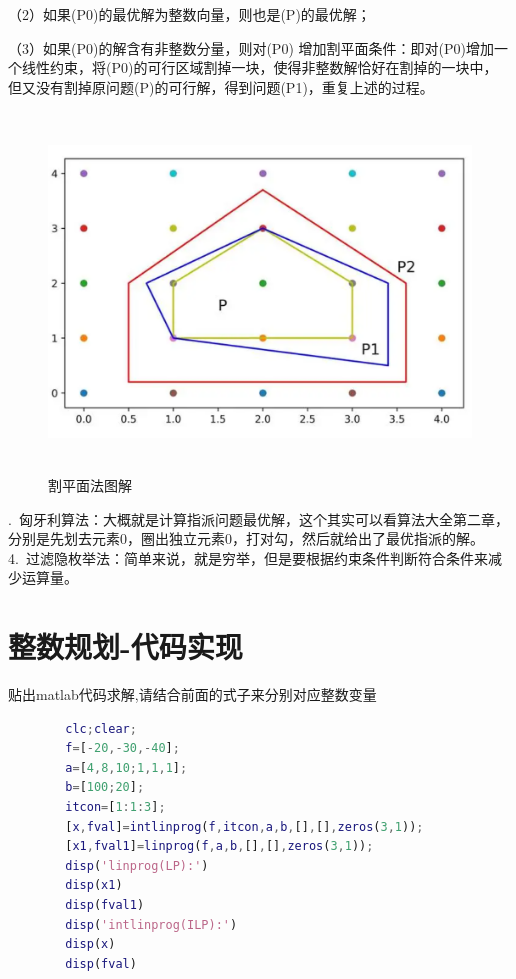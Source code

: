 \documentclass[a4paper,20pt]{article}
\begin{document}
\par \noindent（2）如果(P0)的最优解为整数向量，则也是(P)的最优解；

\par \noindent（3）如果(P0)的解含有非整数分量，则对(P0) 增加割平面条件：即对(P0)增加一个线性约束，将(P0)的可行区域割掉一块，使得非整数解恰好在割掉的一块中， 但又没有割掉原问题(P)的可行解，得到问题(P1)，重复上述的过程。
\begin{figure}[H]
    \centering
    \includegraphics[width=340pt,height=270pt]{figure2.png}
    \caption{割平面法图解}
\end{figure}
\par {}.~匈牙利算法：大概就是计算指派问题最优解，这个其实可以看算法大全第二章，分别是先划去元素0，圈出独立元素0，打对勾，然后就给出了最优指派的解。
\\4.~过滤隐枚举法：简单来说，就是穷举，但是要根据约束条件判断符合条件来减少运算量。
\section{整数规划-代码实现}
\par 贴出matlab代码求解,请结合前面的式子来分别对应整数变量
\begin{center}
    \begin{lstlisting}[caption={INP},language=Matlab]
        % IntLinear Programming(ILP)
        clc;clear;
        f=[-20,-30,-40];
        a=[4,8,10;1,1,1];
        b=[100;20];
        itcon=[1:1:3];
        [x,fval]=intlinprog(f,itcon,a,b,[],[],zeros(3,1));
        [x1,fval1]=linprog(f,a,b,[],[],zeros(3,1));
        disp('linprog(LP):')
        disp(x1)
        disp(fval1)
        disp('intlinprog(ILP):')
        disp(x)
        disp(fval)
        \end{lstlisting}
\end{center}
\end{document}
